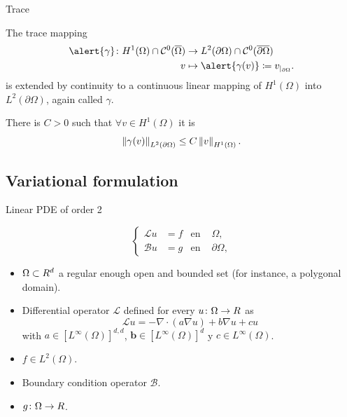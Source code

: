\begin{frame}{Trace}

	\begin{theorem}[Trace]
		
		The trace mapping
		\begin{align*}
		\alert{\gamma}\colon H^1(\Omega)\cap\mathcal{C}^0(\overline{\Omega})&\to L^2(\partial\Omega)\cap \mathcal{C}^0(\overline{\partial\Omega})\\
		v	&\mapsto\alert{\gamma(v)}\coloneqq v_{|_{\partial\Omega}}.
		\end{align*}
		is extended by continuity to a continuous linear mapping of $H^1(\Omega)$ into $L^2(\partial\Omega)$,  again called $\gamma$.
		
		There is $C>0$ such that $\forall v\in H^1(\Omega)$ it is $$\left\|\gamma(v)\right\|_{L^2(\partial \Omega)}\leq C\left\|v\right\|_{H^1(\Omega)}.$$
	\end{theorem}
	
\end{frame}

\subsection{Variational formulation}

\begin{frame}{Linear PDE of order 2}
\begin{block}{}
\begin{equation*}
\label{ecuacion_general}
\left\{
\begin{aligned}
\mathcal{L}u&=f & \text{en } &\Omega, \\
\mathcal{B}u&=g & \text{en } &\partial\Omega,
\end{aligned}
\right.
\end{equation*}
\end{block}

\begin{itemize}\itemsep1em
\item $\Omega\subset \relax R^d$ a regular enough open and bounded set (for instance, a polygonal domain).
\item Differential operator $\mathcal{L}$ defined for every $u\colon\Omega\to\relax R$ as $$\mathcal{L}u=-\nabla\cdot(a\nabla u)+b\nabla u+c u$$ with $a\in [L^\infty(\Omega)]^{d,d}$, $\mathbf{b}\in [L^\infty(\Omega)]^d$ y $c\in L^\infty(\Omega)$.
\item $f\in L^2(\Omega)$.
\item Boundary condition operator $\mathcal{B}$.
\item $g\colon\Omega\to\relax R$.
\end{itemize}

\end{frame}

